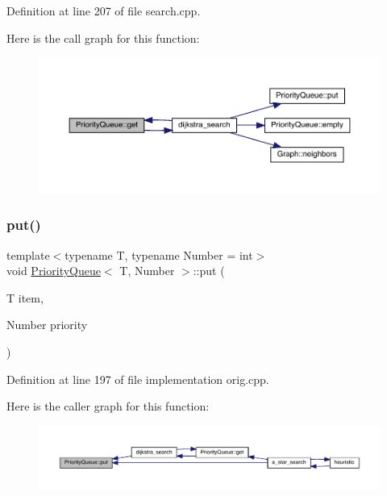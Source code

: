 Definition at line 207 of file search.\+cpp.

Here is the call graph for this function\+:
\nopagebreak
\begin{figure}[H]
\begin{center}
\leavevmode
\includegraphics[width=350pt]{struct_priority_queue_ab211c9583fda5c1a6352021444af5f0e_cgraph}
\end{center}
\end{figure}
\mbox{\label{struct_priority_queue_a9361c94664b98a15a91a595d65c9846c}} 
\subsubsection{\texorpdfstring{put()}{put()}\hspace{0.1cm}{\footnotesize\ttfamily [1/2]}}
{\footnotesize\ttfamily template$<$typename T, typename Number = int$>$ \\
void \hyperlink{struct_priority_queue}{Priority\+Queue}$<$ T, Number $>$\+::put (\begin{DoxyParamCaption}\item[{T}]{item,  }\item[{Number}]{priority }\end{DoxyParamCaption})\hspace{0.3cm}{\ttfamily [inline]}}



Definition at line 197 of file implementation orig.\+cpp.

Here is the caller graph for this function\+:\nopagebreak
\begin{figure}[H]
\begin{center}
\leavevmode
\includegraphics[width=350pt]{struct_priority_queue_a9361c94664b98a15a91a595d65c9846c_icgraph}
\end{center}
\end{figure}
\mbox{\label{struct_priority_queue_a9361c94664b98a15a91a595d65c9846c}} 
